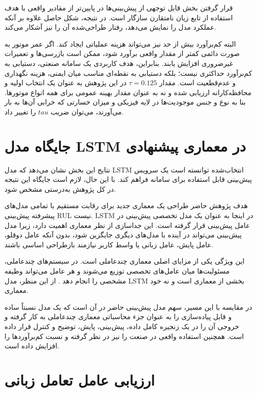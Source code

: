 \documentclass[a4paper,fleqn]{report}
\begin{document}
قرار گرفتن بخش قابل توجهی از پیش‌بینی‌ها در پایین‌تر از مقادیر واقعی با هدف استفاده از تابع زیان نامتقارن سازگار است. در نتیجه، شکل حاصل علاوه بر آنکه عملکرد مدل را نمایش می‌دهد، رفتار طراحی‌شده آن را نیز آشکار می‌کند.

البته کم‌برآورد بیش از حد نیز می‌تواند هزینه عملیاتی ایجاد کند. اگر عمر موتور به صورت دائمی کمتر از مقدار واقعی برآورد شود، ممکن است بازرسی‌ها و تعمیرات غیرضروری افزایش یابند. بنابراین، هدف کاربردی یک سامانه صنعتی، دستیابی به کم‌برآورد حداکثری نیست؛ بلکه دستیابی به نقطه‌ای مناسب میان ایمنی، هزینه نگهداری و عدم‌قطعیت است. مقدار $\tau=0.125$ در این پژوهش به عنوان یک انتخاب اولیه و محافظه‌کارانه ارزیابی شده و نه به عنوان مقدار بهینه عمومی برای همه انواع موتورها. بنا به نوع و جنس موجودیت‌ها در لایه فیزیکی و میزان خسارتی که خرابی آن‌ها به بار می‌آورند، می‌توان ضریب $tau$ را تغییر داد.

\section{جایگاه مدل LSTM در معماری پیشنهادی}
\label{sec:lstm-role}

نتایج این بخش نشان می‌دهد که مدل LSTM انتخاب‌شده توانسته است یک سرویس پیش‌بینی قابل استفاده برای سامانه فراهم کند. با این ‌حال، لازم است جایگاه این نتیجه در کل پژوهش به‌درستی مشخص شود.

هدف پژوهش حاضر طراحی یک معماری جدید برای رقابت مستقیم با تمامی مدل‌های پیشرفته پیش‌بینی \gls{RUL} نیست. LSTM در اینجا به عنوان یک مدل تخصصی پیش‌بینی در عامل پیش‌بینی قرار گرفته است. این جداسازی از نظر معماری اهمیت دارد، زیرا مدل پیش‌بینی می‌تواند در آینده با مدل‌های دیگری جایگزین شود، بدون آنکه عامل دوقلو، عامل پایش، عامل زبانی یا واسط کاربر نیازمند بازطراحی اساسی باشند.

این ویژگی یکی از مزایای اصلی معماری چندعاملی است. در سیستم‌های چندعاملی، مسئولیت‌ها میان عامل‌های تخصصی توزیع می‌شوند و هر عامل می‌تواند وظیفه مشخصی را انجام دهد \cite{dorri2018multiagent,pretel2022masdt,lopez2024madtwin}. از این منظر، مدل LSTM بخشی از معماری است و نه خود معماری.


در مقایسه با این مسیر، سهم مدل پیش‌بینی حاضر در آن است که یک مدل نسبتاً ساده و قابل پیاده‌سازی را به عنوان جزء محاسباتی معماری چندعاملی به کار گرفته و خروجی آن را در یک زنجیره کامل داده، پیش‌بینی، پایش، توضیح و کنترل قرار داده است. همچنین استفاده واقعی در صنعت را نیز در نظر گرفته و نسبت کم‌برآورد‌ها را افزایش داده است.

\section{ارزیابی عامل تعامل زبانی}
\label{sec:llm-evaluation}
\end{document}
